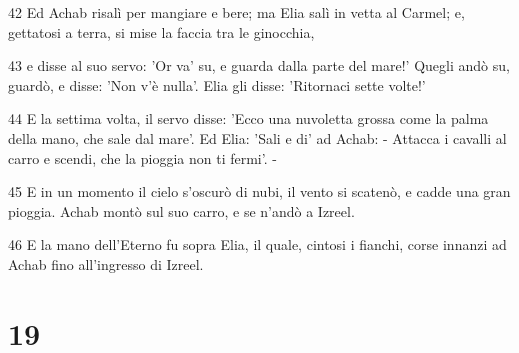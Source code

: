 \par 42 Ed Achab risalì per mangiare e bere; ma Elia salì in vetta al Carmel; e, gettatosi a terra, si mise la faccia tra le ginocchia,
\par 43 e disse al suo servo: 'Or va' su, e guarda dalla parte del mare!' Quegli andò su, guardò, e disse: 'Non v'è nulla'. Elia gli disse: 'Ritornaci sette volte!'
\par 44 E la settima volta, il servo disse: 'Ecco una nuvoletta grossa come la palma della mano, che sale dal mare'. Ed Elia: 'Sali e di' ad Achab: - Attacca i cavalli al carro e scendi, che la pioggia non ti fermi'. -
\par 45 E in un momento il cielo s'oscurò di nubi, il vento si scatenò, e cadde una gran pioggia. Achab montò sul suo carro, e se n'andò a Izreel.
\par 46 E la mano dell'Eterno fu sopra Elia, il quale, cintosi i fianchi, corse innanzi ad Achab fino all'ingresso di Izreel.

\chapter{19}

